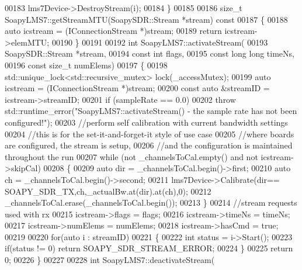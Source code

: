 \begin{DoxyCode}
00183         lms7Device->DestroyStream(i);
00184 \}
00185 
00186 \textcolor{keywordtype}{size\_t} SoapyLMS7::getStreamMTU(SoapySDR::Stream *stream)\textcolor{keyword}{ const}
00187 \textcolor{keyword}{}\{
00188     \textcolor{keyword}{auto} icstream = (IConnectionStream *)stream;
00189     \textcolor{keywordflow}{return} icstream->elemMTU;
00190 \}
00191 
00192 \textcolor{keywordtype}{int} SoapyLMS7::activateStream(
00193     SoapySDR::Stream *stream,
00194     \textcolor{keyword}{const} \textcolor{keywordtype}{int} flags,
00195     \textcolor{keyword}{const} \textcolor{keywordtype}{long} \textcolor{keywordtype}{long} timeNs,
00196     \textcolor{keyword}{const} \textcolor{keywordtype}{size\_t} numElems)
00197 \{
00198     std::unique\_lock<std::recursive\_mutex> lock(\_accessMutex);
00199     \textcolor{keyword}{auto} icstream = (IConnectionStream *)stream;
00200     \textcolor{keyword}{const} \textcolor{keyword}{auto} &streamID = icstream->streamID;
00201     \textcolor{keywordflow}{if} (sampleRate == 0.0)
00202         \textcolor{keywordflow}{throw} std::runtime\_error(\textcolor{stringliteral}{"SoapyLMS7::activateStream() - the sample rate has not been configured!"});
00203     \textcolor{comment}{//perform self calibration with current bandwidth settings}
00204     \textcolor{comment}{//this is for the set-it-and-forget-it style of use case}
00205     \textcolor{comment}{//where boards are configured, the stream is setup,}
00206     \textcolor{comment}{//and the configuration is maintained throughout the run}
00207     \textcolor{keywordflow}{while} (not \_channelsToCal.empty() and not icstream->skipCal)
00208     \{
00209         \textcolor{keyword}{auto} dir  = \_channelsToCal.begin()->first;
00210         \textcolor{keyword}{auto} ch  = \_channelsToCal.begin()->second;
00211         lms7Device->Calibrate(dir== SOAPY\_SDR\_TX,ch,\_actualBw.at(dir).at(ch),0);
00212         \_channelsToCal.erase(\_channelsToCal.begin());
00213     \}
00214     \textcolor{comment}{//stream requests used with rx}
00215     icstream->flags = flags;
00216     icstream->timeNs = timeNs;
00217     icstream->numElems = numElems;
00218     icstream->hasCmd = \textcolor{keyword}{true};
00219 
00220     \textcolor{keywordflow}{for}(\textcolor{keyword}{auto} i : streamID)
00221     \{
00222         \textcolor{keywordtype}{int} status = i->Start();
00223         \textcolor{keywordflow}{if}(status != 0) \textcolor{keywordflow}{return} SOAPY\_SDR\_STREAM\_ERROR;
00224     \}
00225     \textcolor{keywordflow}{return} 0;
00226 \}
00227 
00228 \textcolor{keywordtype}{int} SoapyLMS7::deactivateStream(

\end{DoxyCode}
